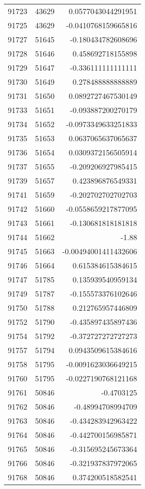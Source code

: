 \begin{tabular}{r | r | r}
91723 & 43629 & 0.0577043044291951 \\
91725 & 43629 & -0.0410768159665816 \\
91727 & 51645 & -0.180434782608696 \\
91728 & 51646 & 0.458692718155898 \\
91729 & 51647 & -0.336111111111111 \\
91730 & 51649 & 0.278488888888889 \\
91731 & 51650 & 0.0892727467530149 \\
91733 & 51651 & -0.093887200270179 \\
91734 & 51652 & -0.0973349633251833 \\
91735 & 51653 & 0.0637065637065637 \\
91736 & 51654 & 0.0309372156505914 \\
91737 & 51655 & -0.209206927985415 \\
91739 & 51657 & 0.423896876549331 \\
91741 & 51659 & -0.202702702702703 \\
91742 & 51660 & -0.0558659217877095 \\
91743 & 51661 & -0.130681818181818 \\
91744 & 51662 & -1.88 \\
91745 & 51663 & -0.00494001411432606 \\
91746 & 51664 & 0.615384615384615 \\
91747 & 51785 & 0.135939540959134 \\
91749 & 51787 & -0.155573376102646 \\
91750 & 51788 & 0.212765957446809 \\
91752 & 51790 & -0.435897435897436 \\
91754 & 51792 & -0.372727272727273 \\
91757 & 51794 & 0.0943509615384616 \\
91758 & 51795 & -0.0091623036649215 \\
91760 & 51795 & -0.0227190768121168 \\
91761 & 50846 & -0.4703125 \\
91762 & 50846 & -0.48994708994709 \\
91763 & 50846 & -0.434283942963422 \\
91764 & 50846 & -0.442700156985871 \\
91765 & 50846 & -0.315695245673364 \\
91766 & 50846 & -0.321937837972065 \\
91768 & 50846 & 0.374200518582541 \\

\end{tabular}
